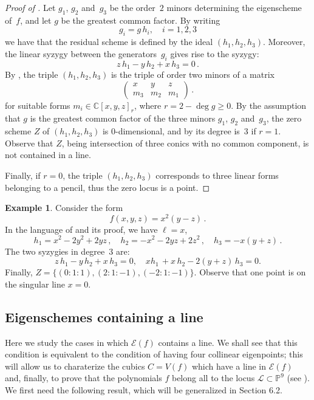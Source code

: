 \documentclass[a4paper, 11pt, reqno]{amsart}
\theoremstyle{plain}
\theoremstyle{definition}
\newtheorem{es}[lemma]{Example}
\newcommand{\C}{\mathbb{C}}
\newcommand{\p}{\mathbb{P}}
\newcommand{\sL}{\mathcal{L}}
\newcommand{\Eig}[1]{\mathcal{E}\!\left( {#1} \right)}
\begin{document}
\begin{proof}[Proof of ]
Let $g_1$, $g_2$ and~$g_3$ be the order~$2$ minors determining the eigenscheme of~$f$, and let $g$ be the greatest common factor.
By writing
%
\[
  g_i = g \, h_i, \quad i=1,2,3
\]
%
we have that the residual scheme is defined by the ideal
$(h_1,h_2,h_3)$. Moreover, the linear
syzygy between the generators~$g_i$ gives rise to the syzygy:
%
\[
  z\, h_1 - y\, h_2 + x\, h_3 = 0 \,.
\]
%
By , the triple $(h_1,h_2,h_3)$ is the triple of order two minors of a matrix
%
\[
  \begin{pmatrix}
    x & y & z \\
    m_3 & m_2 & m_1
  \end{pmatrix} \,.
\]
%
for suitable forms $m_i \in \C[x,y,z]_r$, where $r =2 - \deg g \ge 0$.
By the assumption that $g$ is the greatest common factor of the three minors $g_1$, $g_2$ and~$g_3$, the zero scheme $Z$ of $(h_1,h_2,h_3)$ is $0$-dimensional, and
by  its degree is~$3$ if $r=1$. Observe that $Z$, being intersection of three conics with no common component, is not contained in a line. 

Finally, if $r=0$, the triple $(h_1,h_2,h_3)$ corresponds to three linear forms belonging to a pencil, thus the zero locus is a point.
\end{proof}


\begin{es}
Consider the form
%
\[
  f(x, y, z) = x^2 (y - z) \,.
\]
%
In the language of  and its proof, we have $\ell=x$,
%
\[
 h_1 = x^2-2y^2+2yz \,, \quad 
 h_2 = -x^2-2yz+2z^2\,, \quad 
 h_3 =-x(y+z) \,.
\]
%
The two syzygies in degree~$3$ are:
%
\[
  z \, h_1 - y \, h_2 + x \, h_3 = 0, \quad 
  xh_1 \, +x\,h_2 - 2(y+z) \, h_3 = 0.
\]
%
Finally, $Z = \{ (0:1:1),(2:1:-1),(-2:1:-1) \}$.
Observe that one point is on the singular line $x=0$.
\end{es}


\subsection{Eigenschemes containing a line}
Here we study the cases in which $\Eig{f}$ contains a line. We shall see that
this condition is equivalent to the condition of having four collinear
eigenpoints; this will allow us to charaterize the cubics $C = V(f)$ which have a line
in $\Eig{f}$ and, finally, to prove that the polynomials $f$
belong all to the locus $\sL \subset \p^9$ (see ).
We first need the following result, which will be generalized in Section 6.2.
\end{document}
